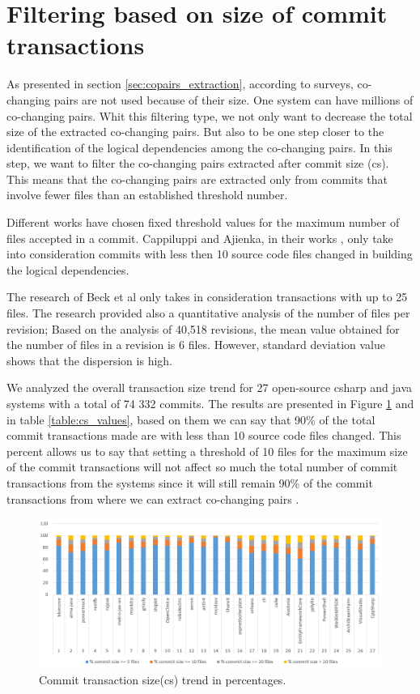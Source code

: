 \documentclass[12pt]{mitthesis}
\begin{document}
\section{Filtering based on size of commit transactions}
\label{sec:filtercommit}

As presented in section \ref{sec:copairs_extraction}, according to surveys,  co-changing pairs are not used because of their size. One system can have millions of co-changing pairs.
Whit this filtering type, we not only want to decrease the total size of the extracted co-changing pairs. But also to be one step closer to the identification of the logical dependencies among the co-changing pairs.
In this step, we want to filter the co-changing pairs extracted after commit size (cs). This means that the co-changing pairs are extracted only from commits that involve fewer files than an established threshold number. 

Different works have chosen fixed threshold values for the maximum number of files accepted in a commit. Cappiluppi and Ajienka, in their works \cite{DBLP:journals/jss/AjienkaC17}, \cite{DBLP:journals/ese/AjienkaCC18} only take into consideration commits with less then 10 source code files changed in building the logical dependencies.

The research of Beck et al \cite{Beck:2011:CMC:2025113.2025162} only takes in consideration transactions with up to 25 files. The research \cite{Oliva:2011:ISL:2067853.2068086} provided also a quantitative analysis of the number of files per revision; Based on the analysis of 40,518 revisions, the mean value obtained for the number of files in a revision is 6 files. However, standard deviation value shows that the dispersion is high. 

We analyzed the overall transaction size trend for 27 open-source csharp and java systems with a total of 74 332 commits. The results are presented in Figure \ref{fig:fig_cs} and in table \ref{table:cs_values}, based on them we can say that 90\% of the total commit transactions made are with less than 10 source code files changed. This percent allows us to say that setting a threshold of 10 files for the maximum size of the commit transactions will not affect so much the total number of commit transactions from the systems since it will still remain 90\% of the commit transactions from where we can extract co-changing pairs \cite{DepSACI}.


\begin{figure}[!h]
\centering
\includegraphics[width=\textwidth]{commit_distribution.png}
\caption{Commit transaction size(cs) trend in percentages.}
\label{fig:fig_cs}
\centering
\end{figure}
\end{document}
